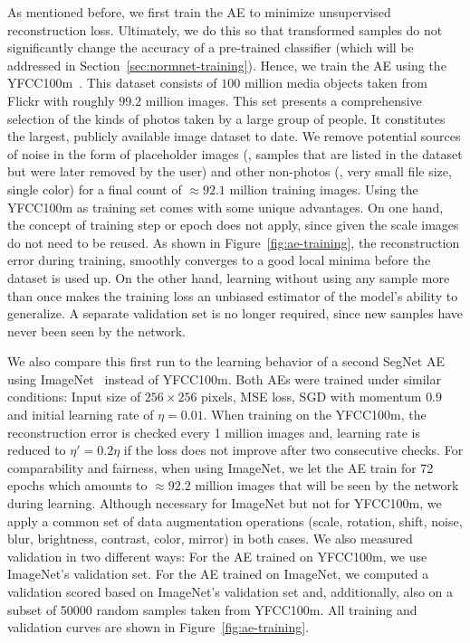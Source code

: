 \documentclass[10pt,twocolumn,a4paper]{article}
\begin{document}
As mentioned before, we first train the AE to minimize unsupervised reconstruction loss.
Ultimately, we do this so that transformed samples do not significantly change the accuracy of a pre-trained classifier (which will be addressed in Section~\ref{sec:normnet-training}).
Hence, we train the AE using the YFCC100m~\cite{YFCC100m}.
This dataset consists of $100$ million media objects taken from Flickr with roughly $99.2$ million images.
This set presents a comprehensive selection of the kinds of photos taken by a large group of people.
It constitutes the largest, publicly available image dataset to date.
We remove potential sources of noise in the form of placeholder images (\ie, samples that are listed in the dataset but were later removed by the user) and other non-photos (\eg, very small file size, single color) for a final count of $\approx 92.1$ million training images.
Using the YFCC100m as training set comes with some unique advantages.
On one hand, the concept of training step or epoch does not apply, since given the scale images do not need to be reused.
As shown in Figure~\ref{fig:ae-training}, the reconstruction error during training, smoothly converges to a good local minima before the dataset is used up.
On the other hand, learning without using any sample more than once makes the training loss an unbiased estimator of the model's ability to generalize.
A separate validation set is no longer required, since new samples have never been seen by the network.

We also compare this first run to the learning behavior of a second SegNet AE using ImageNet~\cite{ILSVRC15} instead of YFCC100m.
Both AEs were trained under similar conditions:
Input size of $256\times 256$ pixels, MSE loss, SGD with momentum $0.9$ and initial learning rate of $\eta = 0.01$.
When training on the YFCC100m, the reconstruction error is checked every 1 million images and, learning rate is reduced to $\eta' = 0.2\eta$ if the loss does not improve after two consecutive checks.
For comparability and fairness, when using ImageNet, we let the AE train for 72 epochs which amounts to $\approx 92.2$ million images that will be seen by the network during learning.
Although necessary for ImageNet but not for YFCC100m, we apply a common set of data augmentation operations (scale, rotation, shift, noise, blur, brightness, contrast, color, mirror) in both cases.
We also measured validation in two different ways:
For the AE trained on YFCC100m, we use ImageNet's validation set.
For the AE trained on ImageNet, we computed a validation scored based on ImageNet's validation set and, additionally, also on a subset of 50000 random samples taken from YFCC100m.
All training and validation curves are shown in Figure~\ref{fig:ae-training}.
\end{document}
